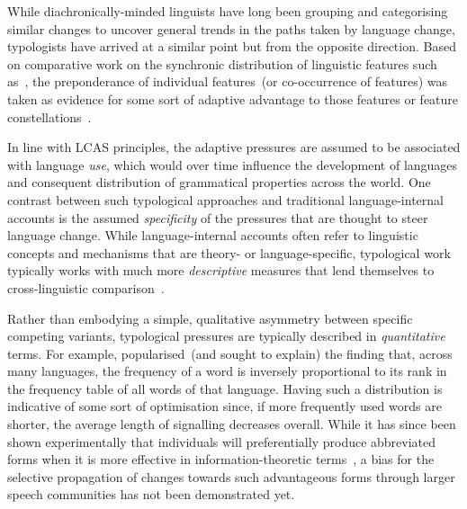 While diachronically-minded linguists have long been grouping and categorising similar changes to uncover general trends in the paths taken by language change, typologists have arrived at a similar point but from the opposite direction. Based on comparative work on the synchronic distribution of linguistic features such as~\citet{Greenberg1963}, the preponderance of individual features~(or co-occurrence of features) was taken as evidence for some sort of adaptive advantage to those features or feature constellations~\citep{Haspelmath2008}.

In line with LCAS principles, the adaptive pressures are assumed to be associated with language \emph{use}, which would over time influence the development of languages and consequent distribution of grammatical properties across the world.
One contrast between such typological approaches and traditional language-internal accounts is the assumed \emph{specificity} of the pressures that are thought to steer language change. While language-internal accounts often refer to linguistic concepts and mechanisms that are theory- or language-specific, typological work typically works with much more \emph{descriptive} measures that lend themselves to cross-linguistic comparison~\citep{Haspelmath2010}.

Rather than embodying a simple, qualitative asymmetry between specific competing variants, typological pressures are typically described in \emph{quantitative} terms. 
For example, \citet{Zipf1935,Zipf1949} popularised~(and sought to explain) the finding that, across many languages, the frequency of a word is inversely proportional to its rank in the frequency table of all words of that language.
Having such a distribution is indicative of some sort of optimisation since, if more frequently used words are shorter, the average length of signalling decreases overall. While it has since been shown experimentally that individuals will preferentially produce abbreviated forms when it is more effective in information-theoretic terms~\citep{Mahowald2013,Kanwal2017}, a bias for the selective propagation of changes towards such advantageous forms through larger speech communities has not been demonstrated yet.


